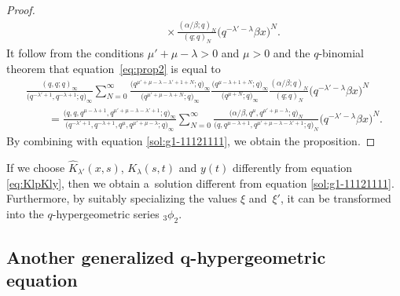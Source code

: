 \documentclass[pdftex]{sigma}
\numberwithin{equation}{section}
\theoremstyle{definition}
\begin{document}
\begin{proof}
\begin{gather}
\phantom{\qquad=}{} \times \frac{(\alpha /\beta ; q)_N}{(q; q)_N} \bigl(q^{ -\lambda ' -\lambda } \beta x\bigr)^N.  \label{eq:prop2}
\end{gather}
It follow from the conditions $ \mu' +\mu - \lambda >0$ and $\mu >0 $ and the $q$-binomial theorem that equation~\eqref{eq:prop2} is equal to
\begin{gather*}
 \frac{(q, q; q)_{\infty}}{\bigl(q^{-\lambda' + 1} , q^{- \lambda + 1} ; q\bigr)_{\infty}} \sum_{N=0}^{\infty}
\frac{ \bigl(q^{\mu' +\mu - \lambda -\lambda' + 1 +N } ; q\bigr)_{\infty} }{\bigl(q^{\mu' +\mu - \lambda +N } ; q\bigr)_{\infty}} \frac{ \bigl(q^{\mu -\lambda + 1 + N} ; q\bigr)_{\infty} }{\bigl(q^{\mu +N} ; q\bigr)_{\infty}} \frac{(\alpha /\beta ; q)_N}{(q; q)_N} \bigl(q^{ -\lambda ' -\lambda } \beta x\bigr)^N \\
\qquad = \frac{\bigl(q, q, q^{\mu -\lambda + 1} , q^{\mu' +\mu - \lambda -\lambda' + 1 } ; q\bigr)_{\infty}}{\bigl(q^{-\lambda' + 1} , q^{- \lambda + 1} , q^{\mu } , q^{\mu' +\mu - \lambda } ; q\bigr)_{\infty}} \sum_{N=0}^{\infty} \frac{\bigl(\alpha /\beta , q^{\mu }, q^{\mu' +\mu - \lambda } ; q\bigr)_N}{\bigl(q, q^{\mu -\lambda + 1} , q^{\mu' +\mu - \lambda -\lambda' + 1 } ; q\bigr)_N} \bigl(q^{ -\lambda ' -\lambda } \beta x\bigr)^N.
\end{gather*}
By combining with equation \eqref{sol:g1-11121111}, we obtain the proposition.
\end{proof}

If we choose $\widehat{K}_{\lambda'}(x, s)$, $K_{\lambda}(s, t)$ and $y(t)$ differently from equation \eqref{eq:KlpKly}, then we obtain a~solution different from equation \eqref{sol:g1-11121111}.
Furthermore, by suitably specializing the values $\xi$ and~$\xi'$, it can be transformed into the $q$-hypergeometric series ${}_3\phi_2$.

\subsection[Another generalized q-hypergeometric equation]{Another generalized $\boldsymbol{q}$-hypergeometric equation}
\end{document}
